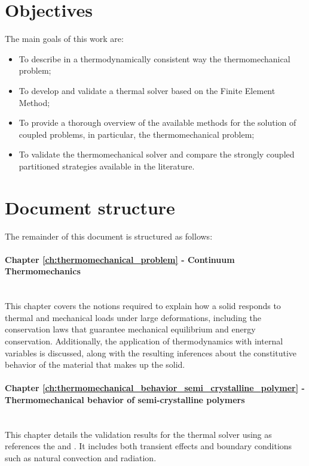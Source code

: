 \section{Objectives}

The main goals of this work are:
\begin{itemize}
    \item To describe in a thermodynamically consistent way the thermomechanical problem;
    \item To develop and validate a thermal solver based on the Finite Element Method;
    \item To provide a thorough overview of the available methods for the solution of coupled problems, in particular, the thermomechanical problem;
    \item To validate the thermomechanical solver and compare the strongly coupled partitioned strategies available in the literature.
\end{itemize}

\section{Document structure}

The remainder of this document is structured as follows:

\paragraph{Chapter \ref{ch:thermomechanical_problem} - Continuum Thermomechanics}\mbox{}\\
This chapter covers the notions required to explain how a solid responds to thermal and mechanical loads under large deformations, including the conservation laws that guarantee mechanical equilibrium and energy conservation.
Additionally, the application of thermodynamics with internal variables is discussed, along with the resulting inferences about the constitutive behavior of the material that makes up the solid.

\paragraph{Chapter \ref{ch:thermomechanical_behavior_semi_crystalline_polymer} - Thermomechanical behavior of semi-crystalline polymers}\mbox{}\\
This chapter details the validation results for the thermal solver using as references the \cite{DINEN1991_1_2} and \cite{NAFEMSbenchmarks}.
It includes both transient effects and boundary conditions such as natural convection and radiation.

